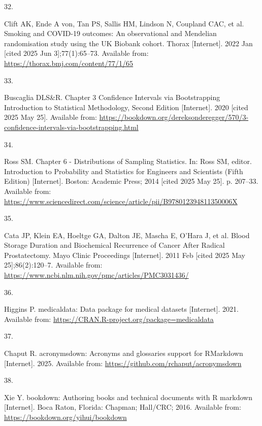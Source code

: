 \documentclass[
]{article}
\newlength{\cslhangindent}
\newlength{\csllabelwidth}
\newenvironment{CSLReferences}[2] %
 {\begin{list}{}{%
  \setlength{\itemindent}{0pt}
  \setlength{\leftmargin}{0pt}
  \setlength{\parsep}{0pt}
  \ifodd #1
   \setlength{\leftmargin}{\cslhangindent}
   \setlength{\itemindent}{-1\cslhangindent}
  \fi
  \setlength{\itemsep}{#2\baselineskip}}}
 {\end{list}}
\newcommand{\CSLLeftMargin}[1]{\parbox[t]{\csllabelwidth}{\strut#1\strut}}
\newcommand{\CSLRightInline}[1]{\parbox[t]{\linewidth - \csllabelwidth}{\strut#1\strut}}
\begin{document}
\begin{CSLReferences}{0}{1}
\CSLLeftMargin{32. }%
\CSLRightInline{Clift AK, Ende A von, Tan PS, Sallis HM, Lindson N, Coupland CAC, et al. Smoking and {COVID}-19 outcomes: An observational and {Mendelian} randomisation study using the {UK} {Biobank} cohort. Thorax {[}Internet{]}. 2022 Jan {[}cited 2025 Jun 3{]};77(1):65--73. Available from: \url{https://thorax.bmj.com/content/77/1/65}}

\CSLLeftMargin{33. }%
\CSLRightInline{Buscaglia DLS\&R. Chapter 3 {Confidence} {Intervals} via {Bootstrapping} {\textbar} {Introduction} to {Statistical} {Methodology}, {Second} {Edition} {[}Internet{]}. 2020 {[}cited 2025 May 25{]}. Available from: \url{https://bookdown.org/dereksonderegger/570/3-confidence-intervals-via-bootstrapping.html}}

\CSLLeftMargin{34. }%
\CSLRightInline{Ross SM. Chapter 6 - {Distributions} of {Sampling} {Statistics}. In: Ross SM, editor. Introduction to {Probability} and {Statistics} for {Engineers} and {Scientists} ({Fifth} {Edition}) {[}Internet{]}. Boston: Academic Press; 2014 {[}cited 2025 May 25{]}. p. 207--33. Available from: \url{https://www.sciencedirect.com/science/article/pii/B978012394811350006X}}

\CSLLeftMargin{35. }%
\CSLRightInline{Cata JP, Klein EA, Hoeltge GA, Dalton JE, Mascha E, O'Hara J, et al. Blood {Storage} {Duration} and {Biochemical} {Recurrence} of {Cancer} {After} {Radical} {Prostatectomy}. Mayo Clinic Proceedings {[}Internet{]}. 2011 Feb {[}cited 2025 May 25{]};86(2):120--7. Available from: \url{https://www.ncbi.nlm.nih.gov/pmc/articles/PMC3031436/}}

\CSLLeftMargin{36. }%
\CSLRightInline{Higgins P. {medicaldata}: Data package for medical datasets {[}Internet{]}. 2021. Available from: \url{https://CRAN.R-project.org/package=medicaldata}}

\CSLLeftMargin{37. }%
\CSLRightInline{Chaput R. {acronymsdown}: Acronyms and glossaries support for RMarkdown {[}Internet{]}. 2025. Available from: \url{https://github.com/rchaput/acronymsdown}}

\CSLLeftMargin{38. }%
\CSLRightInline{Xie Y. {bookdown}: Authoring books and technical documents with {R} markdown {[}Internet{]}. Boca Raton, Florida: Chapman; Hall/CRC; 2016. Available from: \url{https://bookdown.org/yihui/bookdown}}


\end{CSLReferences}
\end{document}
